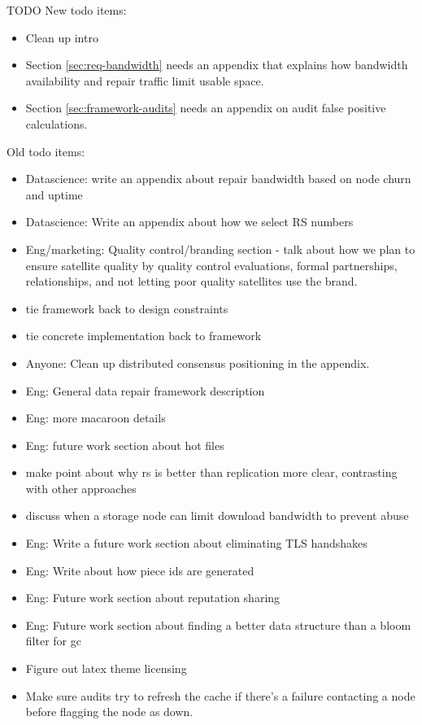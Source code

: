\documentclass[11pt,fleqn,openany]{book}
\newcommand{\todo}[1]{{\color{red} TODO #1 }}
\begin{document}
\todo{
New todo items:
\begin{itemize}
\item Clean up intro
\item Section \ref{sec:req-bandwidth} needs an appendix that explains how
  bandwidth availability and repair traffic limit usable space.
\item Section \ref{sec:framework-audits} needs an appendix on audit false
  positive calculations.
\end{itemize}

Old todo items:
\begin{itemize}
\item Datascience: write an appendix about repair bandwidth based on node
  churn and uptime
\item Datascience: Write an appendix about how we select RS numbers
\item Eng/marketing: Quality control/branding section - talk about how we
  plan to ensure satellite quality by quality control evaluations, formal
  partnerships, relationships, and not letting poor quality satellites
  use the brand.
\item tie framework back to design constraints
\item tie concrete implementation back to framework
\item Anyone:
  Clean up distributed consensus positioning in the appendix.
\item Eng: General data repair framework description
\item Eng: more macaroon details
\item Eng: future work section about hot files
\item make point about why rs is better than replication more clear,
  contrasting with other approaches
\item discuss when a storage node can limit download bandwidth to prevent
  abuse
\item Eng: Write a future work section about eliminating TLS handshakes
\item Eng: Write about how piece ids are generated
\item Eng: Future work section about reputation sharing
\item Eng: Future work section about finding a better data structure than
 a bloom filter for gc
\item Figure out latex theme licensing
\item Make sure audits try to refresh the cache if there's a failure contacting
  a node before flagging the node as down.
\end{itemize}
}

\newpage

\begingroup
\raggedright

\endgroup
\end{document}
